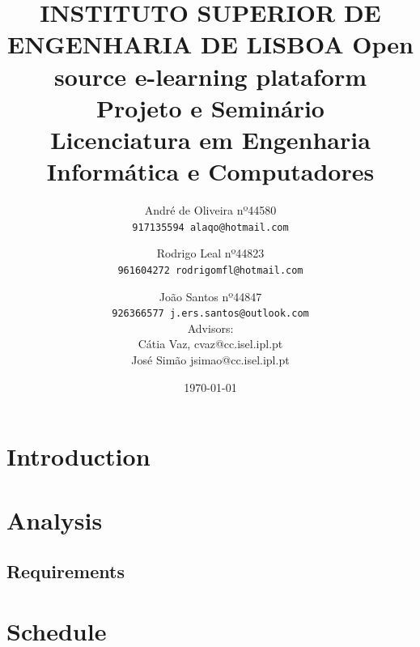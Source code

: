 \documentclass[12pt,a4paper]{article}
\def\paperid{\hfill}
\begin{document}
\title{\vskip-1.45cm
\hskip-13cm  {\small {\vskip-1.45cm{\hskip2.8cm\textbf{INSTITUTO SUPERIOR DE ENGENHARIA DE LISBOA}}}}
\vskip1.45cm
{\bf Open source e-learning plataform} \\[2ex]
{\small Projeto e Seminário\\[-1ex]
 Licenciatura em Engenharia Informática e Computadores}
}

\author{
  {\small André de Oliveira nº44580}
  \\
  \texttt{{\small 917135594 alaqo@hotmail.com}}
  \and
  {\small Rodrigo Leal nº44823}
  \\
  \texttt{{\small961604272 rodrigomfl@hotmail.com}}
  \and
  {\small João Santos nº44847}
  \\
  \texttt{{\small926366577 j.ers.santos@outlook.com}}
  \\[0.5cm]{\small Advisors:} 
  \\
  {\small Cátia Vaz, cvaz@cc.isel.ipl.pt}
  \\{\small José Simão jsimao@cc.isel.ipl.pt}
}

\date{\small\today}
\maketitle
\def\paperid{\hfill}

\section{Introduction}\label{section:primeiraSec}


\section{Analysis}

\subsection{Requirements}


\section{Schedule}




\end{document}

